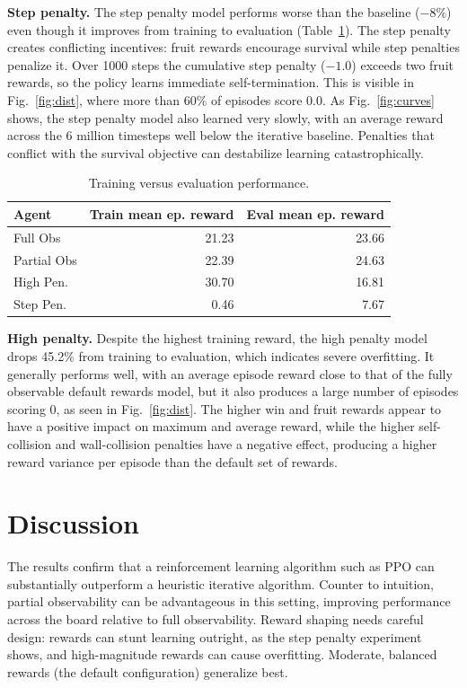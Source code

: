 \documentclass[10pt, conference, letterpaper]{IEEEtran}
\begin{document}
\textbf{Step penalty.} The step penalty model performs worse than the baseline ($-8\%$) even though it improves from training to evaluation (Table~\ref{tab:trainval}). The step penalty creates conflicting incentives: fruit rewards encourage survival while step penalties penalize it. Over 1000 steps the cumulative step penalty ($-1.0$) exceeds two fruit rewards, so the policy learns immediate self-termination. This is visible in Fig.~\ref{fig:dist}, where more than 60\% of episodes score 0.0. As Fig.~\ref{fig:curves} shows, the step penalty model also learned very slowly, with an average reward across the 6 million timesteps well below the iterative baseline. Penalties that conflict with the survival objective can destabilize learning catastrophically.

\begin{table}[t]
\centering
\caption{Training versus evaluation performance.}
\label{tab:trainval}
\begin{tabular}{lrr}
\toprule
Agent & Train mean ep. reward & Eval mean ep. reward \\
\midrule
Full Obs     & 21.23 & 23.66 \\
Partial Obs  & 22.39 & 24.63 \\
High Pen.    & 30.70 & 16.81 \\
Step Pen.    & 0.46  & 7.67 \\
\bottomrule
\end{tabular}
\end{table}

\textbf{High penalty.} Despite the highest training reward, the high penalty model drops 45.2\% from training to evaluation, which indicates severe overfitting. It generally performs well, with an average episode reward close to that of the fully observable default rewards model, but it also produces a large number of episodes scoring 0, as seen in Fig.~\ref{fig:dist}. The higher win and fruit rewards appear to have a positive impact on maximum and average reward, while the higher self-collision and wall-collision penalties have a negative effect, producing a higher reward variance per episode than the default set of rewards.

\section{Discussion}

The results confirm that a reinforcement learning algorithm such as PPO can substantially outperform a heuristic iterative algorithm. Counter to intuition, partial observability can be advantageous in this setting, improving performance across the board relative to full observability. Reward shaping needs careful design: rewards can stunt learning outright, as the step penalty experiment shows, and high-magnitude rewards can cause overfitting. Moderate, balanced rewards (the default configuration) generalize best.
\end{document}
